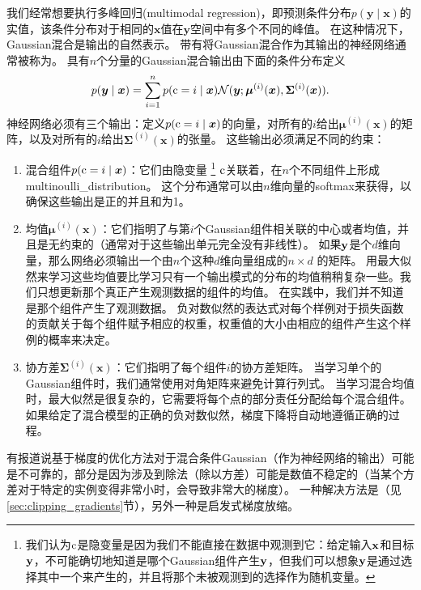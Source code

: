
我们经常想要执行多峰回归(multimodal regression)，即预测条件分布$p(\bm{y}\mid\bm{x})$的实值，该条件分布对于相同的$\bm{x}$值在$\bm{y}$空间中有多个不同的峰值。
在这种情况下，Gaussian混合是输出的自然表示\citep{Jacobs-nc91,bishop1994mixture}。
带有将Gaussian混合作为其输出的神经网络通常被称为。
具有$n$个分量的Gaussian混合输出由下面的条件分布定义
\begin{equation}
p(\bm{y}\mid\bm{x}) = \sum_{i=1}^n p(\mathrm{c} = i \mid \bm{x}) \mathcal{N}(\bm{y}; \bm{\mu}^{(i)}(\bm{x}), \bm{\Sigma}^{(i)}(\bm{x})).
\end{equation}
神经网络必须有三个输出：定义$p(\mathrm{c}=i\mid\bm{x})$的向量，对所有的$i$给出$\bm{\mu}^{(i)}(\bm{x})$的矩阵，以及对所有的$i$给出$\bm{\Sigma}^{(i)}(\bm{x})$的张量。
这些输出必须满足不同的约束：
\begin{enumerate}
\item 混合组件$p(\mathrm{c}=i\mid\bm{x})$：它们由隐变量
\footnote{我们认为$\mathrm{c}$是隐变量是因为我们不能直接在数据中观测到它：给定输入$\mathbf{x}$和目标$\mathbf{y}$，不可能确切地知道是哪个Gaussian组件产生$\mathbf{y}$，但我们可以想象$\mathbf{y}$是通过选择其中一个来产生的，并且将那个未被观测到的选择作为随机变量。}
$\mathrm{c}$关联着，在$n$个不同组件上形成\gls{multinoulli_distribution}。
这个分布通常可以由$n$维向量的softmax来获得，以确保这些输出是正的并且和为1。

\item 均值$\bm{\mu}^{(i)}(\bm{x})$：它们指明了与第$i$个Gaussian组件相关联的中心或者均值，并且是无约束的（通常对于这些输出单元完全没有非线性）。
如果$\mathbf{y}$是个$d$维向量，那么网络必须输出一个由$n$个这种$d$维向量组成的$n\times d$ 的矩阵。
用最大似然来学习这些均值要比学习只有一个输出模式的分布的均值稍稍复杂一些。我们只想更新那个真正产生观测数据的组件的均值。
在实践中，我们并不知道是那个组件产生了观测数据。
负对数似然的表达式对每个样例对于损失函数的贡献关于每个组件赋予相应的权重，权重值的大小由相应的组件产生这个样例的概率来决定。

\item 协方差$\bm{\Sigma}^{(i)}(\bm{x})$：它们指明了每个组件$i$的协方差矩阵。
当学习单个的Gaussian组件时，我们通常使用对角矩阵来避免计算行列式。
当学习混合均值时，最大似然是很复杂的，它需要将每个点的部分责任分配给每个混合组件。
如果给定了混合模型的正确的负对数似然，梯度下降将自动地遵循正确的过程。
\end{enumerate}
有报道说基于梯度的优化方法对于混合条件Gaussian（作为神经网络的输出）可能是不可靠的，部分是因为涉及到除法（除以方差）可能是数值不稳定的（当某个方差对于特定的实例变得非常小时，会导致非常大的梯度）。
一种解决方法是（见\ref{sec:clipping_gradients}节），另外一种是启发式梯度放缩\citep{Uria+al-ICML2014}。

